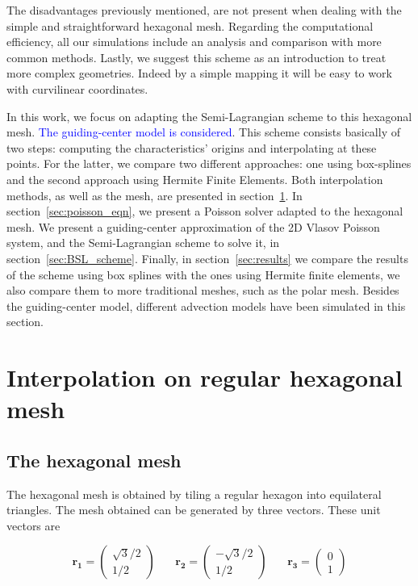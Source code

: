 \documentclass[proc]{edpsmath}
\begin{document}
The disadvantages previously mentioned, are not present when dealing with the simple and straightforward hexagonal mesh. Regarding the computational efficiency, all our simulations include an analysis and comparison with more common methods. Lastly, we suggest this scheme as an introduction to treat more complex geometries. Indeed by a simple mapping it will be easy to work with curvilinear coordinates.

In this work, we focus on adapting the Semi-Lagrangian scheme to this hexagonal mesh. \textcolor{blue}{The guiding-center model is considered}. This scheme consists basically of two steps: computing the characteristics' origins and interpolating at these points. For the latter, we compare two different approaches: one using box-splines and the second approach using Hermite Finite Elements. Both interpolation methods, as well as the mesh, are presented in section~\ref{sec:interpolation}. In section~\ref{sec:poisson_eqn}, we present a Poisson solver adapted to the hexagonal mesh. We present a guiding-center approximation of the 2D Vlasov Poisson system\cite{Golse1998865}, and the Semi-Lagrangian scheme to solve it, in section~\ref{sec:BSL_scheme}. Finally, in section~\ref{sec:results} we compare the results of the scheme using box splines with the ones using Hermite finite elements, we also compare them to more traditional meshes, such as the polar mesh. Besides the guiding-center model, different advection models have been simulated in this section.


\section{Interpolation on regular hexagonal mesh}
\label{sec:interpolation}
\subsection{The hexagonal mesh}

The hexagonal mesh is obtained by tiling a regular hexagon into equilateral triangles. The mesh obtained can be generated by three vectors. These unit vectors are

\begin{equation}
	\mathbf{r_1} = \begin{pmatrix}\sqrt{3}/2 \\  1/2
		\end{pmatrix} ~~~~~~~~
	\mathbf{r_2} = \begin{pmatrix}-\sqrt{3}/2 \\ 1/2
		\end{pmatrix} ~~~~~~~~
	\mathbf{r_3} = \begin{pmatrix} 0 \\ 1
		\end{pmatrix}
\end{equation}
\end{document}
